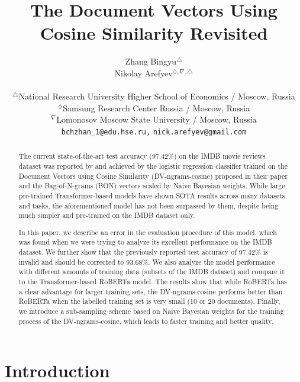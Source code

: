 \documentclass[11pt]{article}
\title{The Document Vectors Using Cosine Similarity Revisited}
\author{Zhang Bingyu$^{\triangle}$ \\
  \And Nikolay Arefyev$^{\diamondsuit,\nabla,\triangle}$ \\
  \AND
  \vspace{-0.8cm}\\
  $^{\triangle}$National Research University Higher School of Economics / Moscow, Russia \\
  $^\diamondsuit$Samsung Research Center Russia / Moscow, Russia \\
  $^{\nabla}$Lomonosov Moscow State University / Moscow, Russia \\
  \texttt{bchzhan\_1@edu.hse.ru,} \texttt{nick.arefyev@gmail.com} \\
}
\begin{document}
\maketitle
\begin{abstract}
The current state-of-the-art test accuracy (97.42\%) on the IMDB movie reviews dataset was reported by \citet{thongtan-phienthrakul-2019-sentiment} and achieved by the logistic regression classifier trained on the Document Vectors using Cosine Similarity (DV-ngrams-cosine) proposed in their paper and the Bag-of-N-grams (BON) vectors scaled by Naive Bayesian weights. While large pre-trained Transformer-based models have shown SOTA results across many datasets and tasks, the aforementioned model has not been surpassed by them, despite being much simpler and pre-trained on the IMDB dataset only. 

In this paper, we describe an error in the evaluation procedure of this model, which was found when we were trying to analyze its excellent performance on the IMDB dataset. We further show that the previously reported test accuracy of 97.42\% is invalid and should be corrected to 93.68\%. We also analyze the model performance with different amounts of training data (subsets of the IMDB dataset) and compare it to the Transformer-based RoBERTa model. The results show that while RoBERTa has a clear advantage for larger training sets,
the DV-ngrams-cosine performs better than RoBERTa when the labelled training set is very small (10 or 20 documents). Finally, we introduce a sub-sampling scheme based on Naive Bayesian weights for the training process of the DV-ngrams-cosine, which leads to faster training and better quality. 
\end{abstract}

\section{Introduction}
\end{document}
